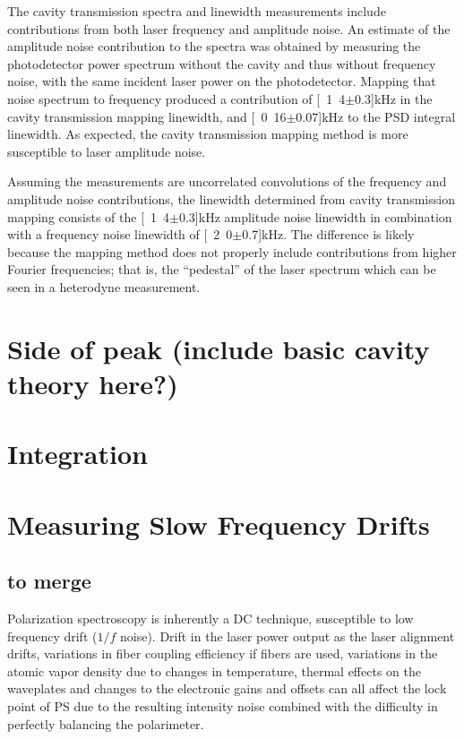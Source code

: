 The cavity transmission spectra and linewidth measurements include contributions from both laser frequency and amplitude noise.
An estimate of the amplitude noise contribution to the spectra was obtained by measuring the photodetector power spectrum without the cavity and thus without frequency noise, with the same incident laser power on the photodetector.
Mapping that noise spectrum to frequency produced a contribution of \unit[1.4$\pm$0.3]{kHz} in the cavity transmission mapping linewidth,  and \unit[0.16$\pm$0.07]{kHz} to the PSD integral linewidth.
As expected, the cavity transmission mapping method is more susceptible to laser amplitude noise. 

Assuming the measurements are uncorrelated convolutions of the frequency and amplitude noise contributions, the linewidth determined from cavity transmission mapping consists of the \unit[1.4$\pm$0.3]{kHz} amplitude noise linewidth in combination with a frequency noise linewidth of \unit[2.0$\pm$0.7]{kHz}.
The difference is likely because the mapping method does not properly include contributions from higher Fourier frequencies; that is, the ``pedestal'' of the laser spectrum which can be seen in a heterodyne measurement.

\section{Side of peak (include basic cavity theory here?)}
\section{Integration}
\section{Measuring Slow Frequency Drifts}
\subsection{to merge}

Polarization spectroscopy is inherently a DC technique, susceptible to low frequency drift ($1/f$ noise).
Drift in the laser power output as the laser alignment drifts, variations in fiber coupling efficiency if fibers are used, variations in the atomic vapor density due to changes in temperature, thermal effects on the waveplates and changes to the electronic gains and offsets can all affect the lock point of PS due to the resulting intensity noise combined with the difficulty in perfectly balancing the polarimeter.

